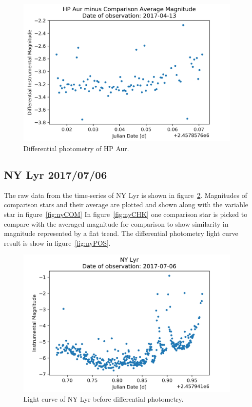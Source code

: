 \begin{figure}[h]
    \centering
    \includegraphics{figures/hpaur170413POS.png}
    \caption{Differential photometry of HP Aur.}
\label{fig:hpPOS}
\end{figure}

\subsection{NY Lyr 2017/07/06}
The raw data from the time-series of NY Lyr is shown in figure~\ref{fig:nyRAW}.
Magnitudes of comparison stars and their average are plotted and shown along with the variable star in figure~\ref{fig:nyCOM}
In figure~\ref{fig:nyCHK} one comparison star is picked to compare with the averaged magnitude for comparison to show similarity
in magnitude represented by a flat trend.
The differential photometry light curve result is show in figure~\ref{fig:nyPOS}.

\begin{figure}[h]
    \centering
    \includegraphics{figures/nylyr170706RAW.png}
    \caption{Light curve of NY Lyr before differential photometry.}
\label{fig:nyRAW}
\end{figure}

